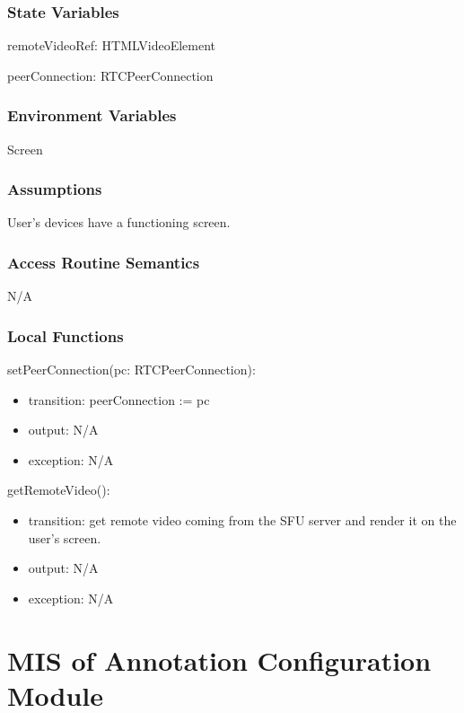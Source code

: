 \documentclass[12pt, titlepage]{article}
\begin{document}
\subsubsection{State Variables}

\noindent remoteVideoRef: HTMLVideoElement

\noindent peerConnection: RTCPeerConnection

\subsubsection{Environment Variables}

\noindent Screen

\subsubsection{Assumptions}

User's devices have a functioning screen.

\subsubsection{Access Routine Semantics}

N/A

\subsubsection{Local Functions}

\noindent setPeerConnection(pc: RTCPeerConnection):
\begin{itemize}
\item transition: peerConnection := pc
\item output: N/A
\item exception: N/A
\end{itemize}

\noindent getRemoteVideo():
\begin{itemize}
\item transition: get remote video coming from the SFU server and render it on the
  user's screen.
\item output: N/A
\item exception: N/A
\end{itemize}


\section{MIS of Annotation Configuration Module} \label{sec:annoconfig}
\end{document}
